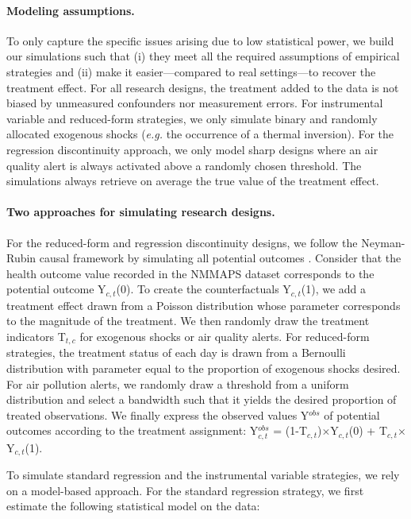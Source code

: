 \documentclass[12pt]{article}
\begin{document}
        \paragraph{Modeling assumptions.} To only capture the specific issues arising due to low statistical power, we build our simulations such that (i) they meet all the required assumptions of empirical strategies and (ii) make it easier---compared to real settings---to recover the treatment effect. For all research designs, the treatment added to the data is not biased by unmeasured confounders nor measurement errors. For instrumental variable and reduced-form strategies, we only simulate binary and randomly allocated exogenous shocks (\textit{e.g.} the occurrence of a thermal inversion). For the regression discontinuity approach, we only model sharp designs where an air quality alert is always activated above a randomly chosen threshold. The simulations always retrieve on average the true value of the treatment effect.
     
        \paragraph{Two approaches for simulating research designs.}

        \begin{sloppypar}
        For the reduced-form and regression discontinuity designs, we follow the Neyman-Rubin causal framework by simulating all potential outcomes \citep{rubin_estimating_1974}. Consider that the health outcome value recorded in the NMMAPS dataset corresponds to the potential outcome Y$_{c,t}$(0). To create the counterfactuals Y$_{c,t}$(1), we add a treatment effect drawn from a Poisson distribution whose parameter corresponds to the magnitude of the treatment. We then randomly draw the treatment indicators T$_{t,c}$ for exogenous shocks or air quality alerts. For reduced-form strategies, the treatment status of each day is drawn from a Bernoulli distribution with parameter equal to the proportion of exogenous shocks desired. For air pollution alerts, we randomly draw a threshold from a uniform distribution and select a bandwidth such that it yields the desired proportion of treated observations. We finally express the observed values Y$^{obs}$ of potential outcomes according to the treatment assignment: Y$^{obs}_{c,t}$ = (1-T$_{c,t}$)$\times$Y$_{c,t}$(0) + T$_{c,t}$$\times$Y$_{c,t}$(1).
        \end{sloppypar}
      
        To simulate standard regression and the instrumental variable strategies, we rely on a model-based approach. For the standard regression strategy, we first estimate the following statistical model on the data:
        
\end{document}
